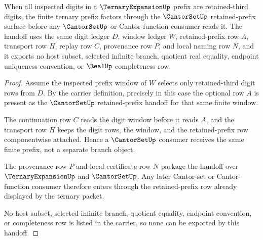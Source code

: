 \begin{theorem}\label{thm:ternary-expansion-cantorset-handoff}
When all inspected digits in a $\TernaryExpansionUp$ prefix are retained-third digits, the finite ternary prefix factors through the $\CantorSetUp$ retained-prefix surface before any $\CantorSetUp$ or Cantor-function consumer reads it. The handoff uses the same digit ledger $D$, window ledger $W$, retained-prefix row $A$, transport row $H$, replay row $C$, provenance row $P$, and local naming row $N$, and it exports no host subset, selected infinite branch, quotient real equality, endpoint uniqueness convention, or $\RealUp$ completeness row.
\end{theorem}
\begin{proof}
Assume the inspected prefix window of $W$ selects only retained-third digit rows from $D$. By the carrier definition, precisely in this case the optional row $A$ is present as the $\CantorSetUp$ retained-prefix handoff for that same finite window.

The continuation row $C$ reads the digit window before it reads $A$, and the transport row $H$ keeps the digit rows, the window, and the retained-prefix row componentwise attached. Hence a $\CantorSetUp$ consumer receives the same finite prefix, not a separate branch object.

The provenance row $P$ and local certificate row $N$ package the handoff over $\TernaryExpansionUp$ and $\CantorSetUp$. Any later Cantor-set or Cantor-function consumer therefore enters through the retained-prefix row already displayed by the ternary packet.

No host subset, selected infinite branch, quotient equality, endpoint convention, or completeness row is listed in the carrier, so none can be exported by this handoff.
\end{proof}


